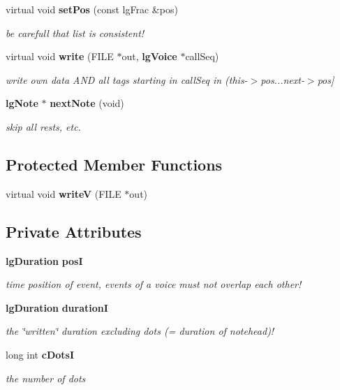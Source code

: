 \begin{CompactItemize}
virtual void {\bf set\-Pos} (const lg\-Frac \&pos)
\begin{CompactList}\small\item\em be carefull that list is consistent! \item\end{CompactList}\item 
virtual void {\bf write} (FILE $\ast$out, {\bf lg\-Voice} $\ast$call\-Seq)
\begin{CompactList}\small\item\em write own data AND all tags starting in call\-Seq in (this-$>$pos...next-$>$pos] \item\end{CompactList}\item 
{\bf lg\-Note} $\ast$ {\bf next\-Note} (void)
\begin{CompactList}\small\item\em skip all rests, etc. \item\end{CompactList}\end{CompactItemize}
\subsection*{Protected Member Functions}
\begin{CompactItemize}
\item 
virtual void {\bf write\-V} (FILE $\ast$out)
\end{CompactItemize}
\subsection*{Private Attributes}
\begin{CompactItemize}
\item 
{\bf lg\-Duration} {\bf pos\-I}
\begin{CompactList}\small\item\em time position of event, events of a voice must not overlap each other! \item\end{CompactList}\item 
{\bf lg\-Duration} {\bf duration\-I}
\begin{CompactList}\small\item\em the \char`\"{}written\char`\"{} duration excluding dots (= duration of notehead)! \item\end{CompactList}\item 
long int {\bf c\-Dots\-I}
\begin{CompactList}\small\item\em the number of dots \item\end{CompactList}\end{CompactItemize}
